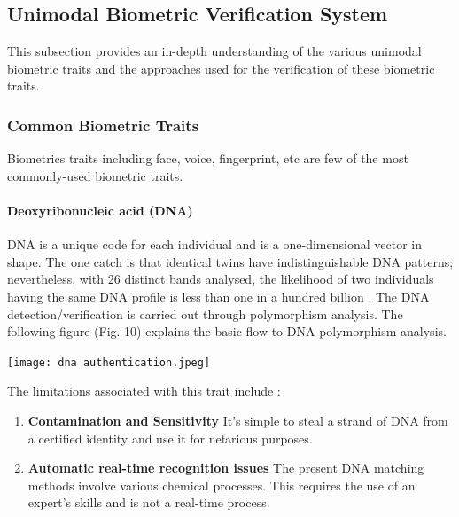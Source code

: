 \documentclass[a4paper, 12pt]{article}
\begin{document}
\subsection{Unimodal Biometric Verification System}
This subsection provides an in-depth understanding of the various unimodal biometric traits and the approaches used for the verification of these biometric traits.
\vskip 0.2in
\subsubsection{Common Biometric Traits}
Biometrics traits including face, voice, fingerprint, etc are few of the most commonly-used biometric traits.
\vskip 0.2in
\paragraph{Deoxyribonucleic acid (DNA)}
DNA is a unique code for each individual and is a one-dimensional vector in shape. The one catch is that identical twins have indistinguishable DNA patterns; nevertheless, with 26 distinct bands analysed, the likelihood of two individuals having the same DNA profile is less than one in a hundred billion \cite{bashir:2015}. The DNA detection/verification is carried out through polymorphism analysis. The following figure (Fig. 10) explains the basic flow to DNA polymorphism analysis.
\begin{center}
\texttt{[image: dna authentication.jpeg]}
\end{center}
\vskip 0.2in
\noindent The limitations associated with this trait include \cite{jain:2004}: 
\begin{enumerate}
\item \textbf{Contamination and Sensitivity} \vskip 0.05in \noindent It's simple to steal a strand of DNA from a certified identity and use it for nefarious purposes.
\item \textbf{Automatic real-time recognition issues} \vskip 0.05in \noindent The present DNA matching methods involve various chemical processes. This requires the use of an expert's skills and is not a real-time process.
\end{enumerate}
\vskip 0.2in
\end{document}
